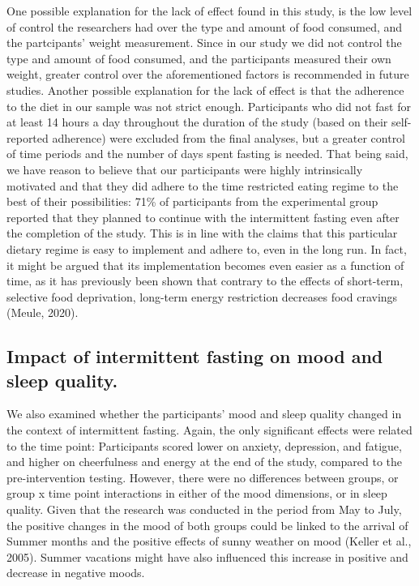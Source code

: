 \documentclass[authordate, empirical,issue]{jote-new-article}
\begin{document}
One possible explanation for the lack of effect found in this study, is the low level of control the researchers had over the type and amount of food consumed, and the partcipants' weight measurement. Since in our study we did not control the type and amount of food consumed, and the participants measured their own weight, greater control over the aforementioned factors is recommended in future studies. Another possible explanation for the lack of effect is that the adherence to the diet in our sample was not strict enough. Participants who did not fast for at least 14 hours a day throughout the duration of the study (based on their self-reported adherence) were excluded from the final analyses, but a greater control of time periods and the number of days spent fasting is needed. That being said, we have reason to believe that our participants were highly intrinsically motivated and that they did adhere to the time restricted eating regime to the best of their possibilities: 71\% of participants from the experimental group reported that they planned to continue with the intermittent fasting even after the completion of the study. This is in line with the claims that this particular dietary regime is easy to implement and adhere to, even in the long run. In fact, it might be argued that its implementation becomes even easier as a function of time, as it has previously been shown that contrary to the effects of short-term, selective food deprivation, long-term energy restriction decreases food cravings (Meule, 2020).



\subsection{Impact of intermittent fasting on mood and sleep quality.}



We also examined whether the participants' mood and sleep quality changed in the context of intermittent fasting. Again, the only significant effects were related to the time point: Participants scored lower on anxiety, depression, and fatigue, and higher on cheerfulness and energy at the end of the study, compared to the pre-intervention testing. However, there were no differences between groups, or group x time point interactions in either of the mood dimensions, or in sleep quality. Given that the research was conducted in the period from May to July, the positive changes in the mood of both groups could be linked to the arrival of Summer months and the positive effects of sunny weather on mood (Keller et al., 2005). Summer vacations might have also influenced this increase in positive and decrease in negative moods.
\end{document}

